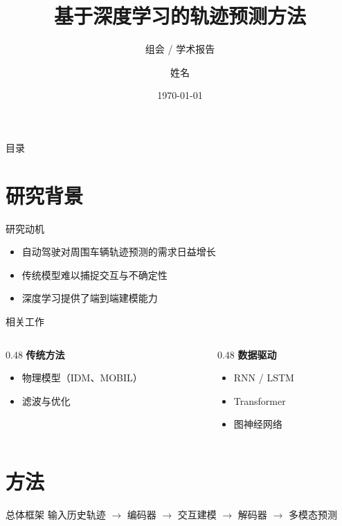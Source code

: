 \documentclass[UTF8,aspectratio=169,10pt]{ctexbeamer}
\title{基于深度学习的轨迹预测方法}
\subtitle{组会 / 学术报告}
\author{姓名}
\institute{单位 / 实验室}
\date{\today}
\begin{document}
\maketitle

\begin{frame}{目录}
  \tableofcontents
\end{frame}

\section{研究背景}

\begin{frame}{研究动机}
  \begin{itemize}
    \item 自动驾驶对周围车辆轨迹预测的需求日益增长
    \item 传统模型难以捕捉交互与不确定性
    \item 深度学习提供了端到端建模能力
  \end{itemize}
\end{frame}

\begin{frame}{相关工作}
  \begin{columns}[T]
    \begin{column}{0.48\textwidth}
      \textbf{传统方法}
      \begin{itemize}
        \item 物理模型（IDM、MOBIL）
        \item 滤波与优化
      \end{itemize}
    \end{column}
    \begin{column}{0.48\textwidth}
      \textbf{数据驱动}
      \begin{itemize}
        \item RNN / LSTM
        \item Transformer
        \item 图神经网络
      \end{itemize}
    \end{column}
  \end{columns}
\end{frame}

\section{方法}

\begin{frame}{总体框架}
  输入历史轨迹 $\rightarrow$ 编码器 $\rightarrow$ 交互建模 $\rightarrow$ 解码器 $\rightarrow$ 多模态预测
\end{frame}
\end{document}
